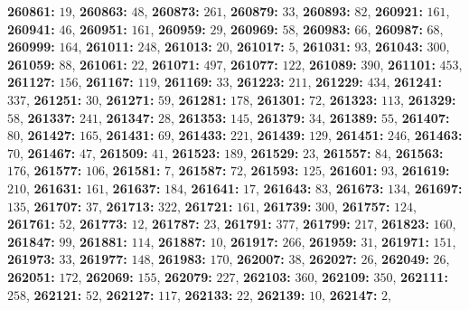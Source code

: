 \textsf{\bfseries 260861:} $19$, \textsf{\bfseries 260863:} $48$, \textsf{\bfseries 260873:} $261$, \textsf{\bfseries 260879:} $33$, \textsf{\bfseries 260893:} $82$, \textsf{\bfseries 260921:} $161$, \textsf{\bfseries 260941:} $46$, \textsf{\bfseries 260951:} $161$, \textsf{\bfseries 260959:} $29$, \textsf{\bfseries 260969:} $58$, \textsf{\bfseries 260983:} $66$, \textsf{\bfseries 260987:} $68$, \textsf{\bfseries 260999:} $164$, \textsf{\bfseries 261011:} $248$, \textsf{\bfseries 261013:} $20$, \textsf{\bfseries 261017:} $5$, \textsf{\bfseries 261031:} $93$, \textsf{\bfseries 261043:} $300$, \textsf{\bfseries 261059:} $88$, \textsf{\bfseries 261061:} $22$, \textsf{\bfseries 261071:} $497$, \textsf{\bfseries 261077:} $122$, \textsf{\bfseries 261089:} $390$, \textsf{\bfseries 261101:} $453$, \textsf{\bfseries 261127:} $156$, \textsf{\bfseries 261167:} $119$, \textsf{\bfseries 261169:} $33$, \textsf{\bfseries 261223:} $211$, \textsf{\bfseries 261229:} $434$, \textsf{\bfseries 261241:} $337$, \textsf{\bfseries 261251:} $30$, \textsf{\bfseries 261271:} $59$, \textsf{\bfseries 261281:} $178$, \textsf{\bfseries 261301:} $72$, \textsf{\bfseries 261323:} $113$, \textsf{\bfseries 261329:} $58$, \textsf{\bfseries 261337:} $241$, \textsf{\bfseries 261347:} $28$, \textsf{\bfseries 261353:} $145$, \textsf{\bfseries 261379:} $34$, \textsf{\bfseries 261389:} $55$, \textsf{\bfseries 261407:} $80$, \textsf{\bfseries 261427:} $165$, \textsf{\bfseries 261431:} $69$, \textsf{\bfseries 261433:} $221$, \textsf{\bfseries 261439:} $129$, \textsf{\bfseries 261451:} $246$, \textsf{\bfseries 261463:} $70$, \textsf{\bfseries 261467:} $47$, \textsf{\bfseries 261509:} $41$, \textsf{\bfseries 261523:} $189$, \textsf{\bfseries 261529:} $23$, \textsf{\bfseries 261557:} $84$, \textsf{\bfseries 261563:} $176$, \textsf{\bfseries 261577:} $106$, \textsf{\bfseries 261581:} $7$, \textsf{\bfseries 261587:} $72$, \textsf{\bfseries 261593:} $125$, \textsf{\bfseries 261601:} $93$, \textsf{\bfseries 261619:} $210$, \textsf{\bfseries 261631:} $161$, \textsf{\bfseries 261637:} $184$, \textsf{\bfseries 261641:} $17$, \textsf{\bfseries 261643:} $83$, \textsf{\bfseries 261673:} $134$, \textsf{\bfseries 261697:} $135$, \textsf{\bfseries 261707:} $37$, \textsf{\bfseries 261713:} $322$, \textsf{\bfseries 261721:} $161$, \textsf{\bfseries 261739:} $300$, \textsf{\bfseries 261757:} $124$, \textsf{\bfseries 261761:} $52$, \textsf{\bfseries 261773:} $12$, \textsf{\bfseries 261787:} $23$, \textsf{\bfseries 261791:} $377$, \textsf{\bfseries 261799:} $217$, \textsf{\bfseries 261823:} $160$, \textsf{\bfseries 261847:} $99$, \textsf{\bfseries 261881:} $114$, \textsf{\bfseries 261887:} $10$, \textsf{\bfseries 261917:} $266$, \textsf{\bfseries 261959:} $31$, \textsf{\bfseries 261971:} $151$, \textsf{\bfseries 261973:} $33$, \textsf{\bfseries 261977:} $148$, \textsf{\bfseries 261983:} $170$, \textsf{\bfseries 262007:} $38$, \textsf{\bfseries 262027:} $26$, \textsf{\bfseries 262049:} $26$, \textsf{\bfseries 262051:} $172$, \textsf{\bfseries 262069:} $155$, \textsf{\bfseries 262079:} $227$, \textsf{\bfseries 262103:} $360$, \textsf{\bfseries 262109:} $350$, \textsf{\bfseries 262111:} $258$, \textsf{\bfseries 262121:} $52$, \textsf{\bfseries 262127:} $117$, \textsf{\bfseries 262133:} $22$, \textsf{\bfseries 262139:} $10$, \textsf{\bfseries 262147:} $2$, 
